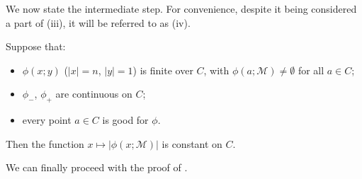 \documentclass[a4paper]{report}
\newcommand{\ind}{\hspace{15pt}}
\newcommand{\M}{\mathcal{M}}
\theoremstyle{definition}
\newenvironment{mlem}[1]{%
	\renewcommand\themleminner{#1}%
	\mleminner
}{\endmleminner}
\theoremstyle{remstyle}
\begin{document}
\ind We now state the intermediate step. For convenience, despite it being considered a part of (iii), it will be referred to as  (iv).

\begin{mlem}{\ref{celldeclem}}[iv]\label{interfinite} Suppose that:
	\begin{itemize}
		\item $\phi(x;y)$ ($|x|=n$, $|y|=1$) is finite over $C$, with $\phi(a;\M)\neq\emptyset$ for all $a\in C$;
		\item $\phi_-$, $\phi_+$ are continuous on $C$;
		\item every point $a\in C$ is good for $\phi$.
	\end{itemize}
	Then the function $x\mapsto|\phi(x;\M)|$ is constant on $C$.
\end{mlem}

\ind We can finally proceed with the proof of .
\end{document}
